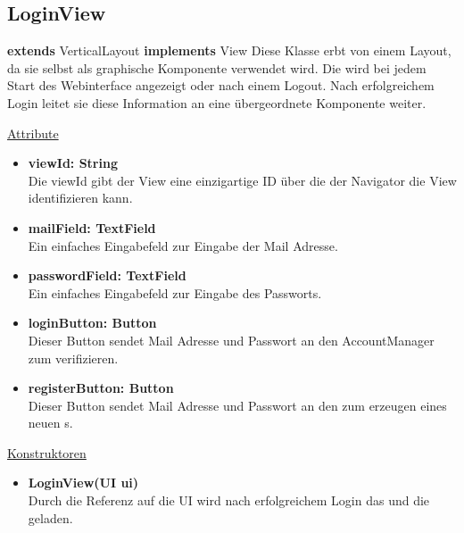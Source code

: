 \newpage
\subsection{LoginView}\label{LoginView}
\textbf{extends}  VerticalLayout \newline
\textbf{implements} View \newline
Diese Klasse erbt von einem Layout, da sie selbst als graphische Komponente verwendet wird. Die  wird bei jedem Start des Webinterface angezeigt oder nach einem Logout. Nach erfolgreichem Login leitet sie diese Information an eine übergeordnete Komponente weiter.
\newline

\underline{Attribute}
\begin{itemize}
\itemsep0pt
\item \textbf{viewId: String} \hfill\\ 
Die viewId gibt der View eine einzigartige ID über die der Navigator die View identifizieren kann.

\item \textbf{mailField: TextField} \hfill\\ 
Ein einfaches Eingabefeld zur Eingabe der Mail Adresse.

\item \textbf{passwordField: TextField} \hfill\\
Ein einfaches Eingabefeld zur Eingabe des Passworts.

\item \textbf{loginButton: Button} \hfill\\
Dieser Button sendet Mail Adresse und Passwort an den AccountManager zum verifizieren.

\item \textbf{registerButton: Button} \hfill\\
Dieser Button sendet Mail Adresse und Passwort an den  zum erzeugen eines neuen s.

\end{itemize}

\underline{Konstruktoren}
\begin{itemize}
\itemsep0pt
\item \textbf{LoginView(UI ui)} \hfill\\
Durch die Referenz auf die UI wird nach erfolgreichem Login das  und die  geladen.
\end{itemize}


